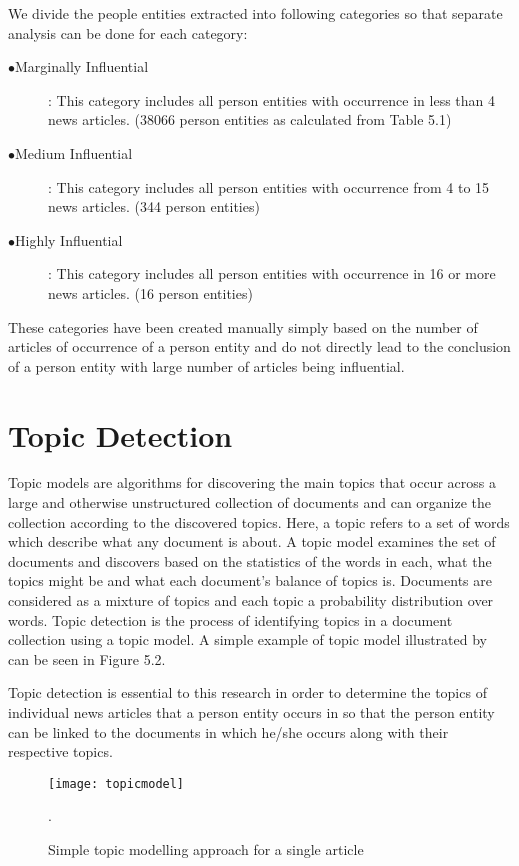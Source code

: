 We divide the people entities extracted into following categories so that separate analysis can be done for each category:
\begin{description}
 \item[$\bullet$Marginally Influential]: This category includes all person entities with occurrence in less than 4 news articles. (38066 person entities as calculated from Table 5.1)
\item[$\bullet$Medium Influential]: This category includes all person entities with occurrence from 4 to 15 news articles. (344 person entities) 
\item[$\bullet$Highly Influential] : This category includes all person entities with occurrence in 16 or more news articles. (16 person entities)
\end{description}
These categories have been created manually simply based on the number of articles of occurrence of a person entity and do not directly lead to the conclusion of a person entity with large number of articles being influential.  


\section{Topic Detection}
\label{topic detection}

 Topic models are algorithms for discovering the main topics that occur across a large and otherwise 
unstructured collection of documents and can organize the collection according to the discovered topics.
Here, a topic refers to a set of words which describe what any document is about.
 A topic model examines the set of documents and discovers based on the statistics of the words in each, what the topics might be and what each document's balance of topics is.
Documents are considered as a mixture of topics and each topic a probability distribution over words.
 Topic detection is the process of identifying topics in a document collection using a topic model. A simple example of topic model illustrated by \cite{blei2012probabilistic} can be seen in Figure 5.2.

Topic detection is essential to this research in order to determine the topics of individual news articles that a person entity occurs in so that the person entity can be linked to the documents in which he/she occurs along with their respective topics.

\begin{figure}[h]
\begin{center}
\texttt{[image: topicmodel]}
\caption{Simple topic modelling approach for a single article\cite{blei2012probabilistic}}.
\end{center}
\end{figure} 



